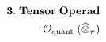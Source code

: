 \documentclass[preview]{standalone}
\begin{document}
\begin{align*}
\special{dvisvgm:raw <g id='unique000'>}\mathbf{3.\;Tensor\;Operad}\\\mathcal{O}_{\text{quant}}\;(\widehat{\otimes}_\pi)\special{dvisvgm:raw </g>}
\end{align*}
\end{document}
